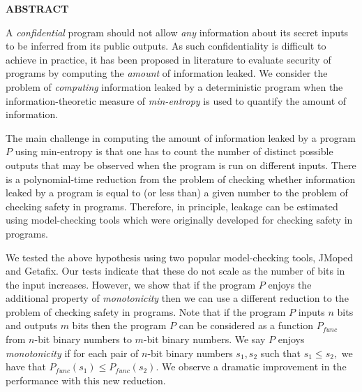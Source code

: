 \newpage
{}

\centerline{\bf \large ABSTRACT}
\vskip 10mm 

A \emph{confidential} program should not allow \emph{any} information about its secret inputs to be inferred from its public outputs.  As such confidentiality is difficult to achieve in practice, it has been proposed in literature to evaluate security of programs by computing the \emph{amount} of information leaked. %
We consider the problem of \emph{computing} 
information leaked by a deterministic  program  when the information-theoretic measure of \emph{min-entropy} is used to quantify the amount of information. 

The main challenge in computing the amount of  information leaked by a program $P$ using min-entropy is that one has to count the number of distinct possible outputs that may be observed when the program is run on different inputs. There is a polynomial-time reduction from the problem of checking whether information leaked by a program is equal to  (or less than) a given number to the problem of checking safety in  programs.  Therefore, in principle,   leakage can be estimated using model-checking tools which were  originally developed for checking safety in programs.  
 
We tested the above  hypothesis using two popular model-checking tools, JMoped and Getafix. Our tests indicate that these   do not scale as  the number of bits
in the input increases.  However, we show that if the program $P$ enjoys the additional property of \emph{monotonicity} then we can use a different reduction to the  problem of checking safety in  programs.  Note that if the program $P$ inputs $n$ bits and outputs $m$ bits then the program $P$ can be considered as  a function $P_{func}$ from $n$-bit binary numbers to $m$-bit binary numbers.    We say $P$ enjoys   
\emph{monotonicity}  if for each pair of $n$-bit  binary numbers $s_1, s_2$  such that  $s_1\leq s_2,$ we have that $P_{func}(s_1) \leq P_{func}(s_2).$ We observe a dramatic improvement in the performance with this new reduction.


  